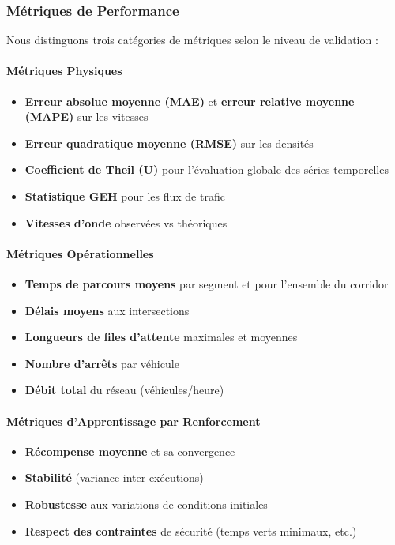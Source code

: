 \subsubsection{Métriques de Performance}
\label{subsec:metriques_performance}

Nous distinguons trois catégories de métriques selon le niveau de validation :

\paragraph{Métriques Physiques}
\begin{itemize}
    \item \textbf{Erreur absolue moyenne (MAE)} et \textbf{erreur relative moyenne (MAPE)} sur les vitesses
    \item \textbf{Erreur quadratique moyenne (RMSE)} sur les densités
    \item \textbf{Coefficient de Theil (U)} pour l'évaluation globale des séries temporelles
    \item \textbf{Statistique GEH} pour les flux de trafic
    \item \textbf{Vitesses d'onde} observées vs théoriques
\end{itemize}

\paragraph{Métriques Opérationnelles}
\begin{itemize}
    \item \textbf{Temps de parcours moyens} par segment et pour l'ensemble du corridor
    \item \textbf{Délais moyens} aux intersections
    \item \textbf{Longueurs de files d'attente} maximales et moyennes
    \item \textbf{Nombre d'arrêts} par véhicule
    \item \textbf{Débit total} du réseau (véhicules/heure)
\end{itemize}

\paragraph{Métriques d'Apprentissage par Renforcement}
\begin{itemize}
    \item \textbf{Récompense moyenne} et sa convergence
    \item \textbf{Stabilité} (variance inter-exécutions)
    \item \textbf{Robustesse} aux variations de conditions initiales
    \item \textbf{Respect des contraintes} de sécurité (temps verts minimaux, etc.)
\end{itemize}


